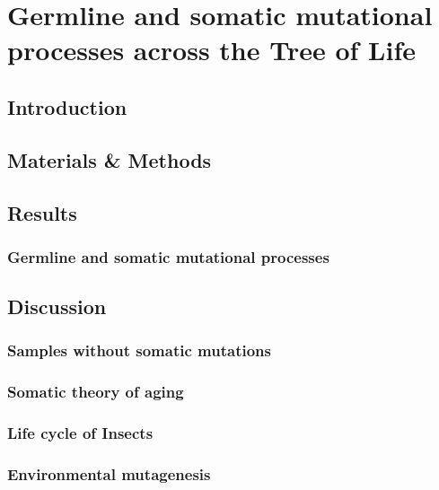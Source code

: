 \chapter{Germline and somatic mutational processes across the Tree of Life}

\ifpdf
    \graphicspath{{Chapter3/Figs/Raster/}{Chapter3/Figs/PDF/}{Chapter3/Figs/}}
\else
    \graphicspath{{Chapter3/Figs/Vector/}{Chapter3/Figs/}}
\fi

\section{Introduction}
\section{Materials \& Methods}
\section{Results}
\subsection{Germline and somatic mutational processes}
\section{Discussion}
\subsection{Samples without somatic mutations}
\subsection{Somatic theory of aging}
\subsection{Life cycle of Insects}
\subsection{Environmental mutagenesis}

